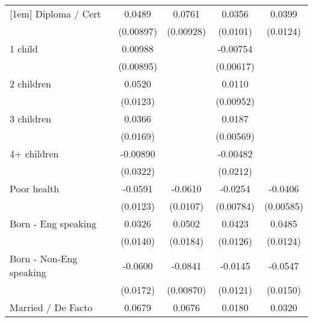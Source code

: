 {\begin{tabular}{l*{4}{c}}
[1em]
Diploma / Cert      &      0.0489\sym{***}&      0.0761\sym{***}&      0.0356\sym{***}&      0.0399\sym{**} \\
                    &   (0.00897)         &   (0.00928)         &    (0.0101)         &    (0.0124)         \\
[1em]
1 child             &     0.00988         &                     &    -0.00754         &                     \\
                    &   (0.00895)         &                     &   (0.00617)         &                     \\
[1em]
2 children          &      0.0520\sym{***}&                     &      0.0110         &                     \\
                    &    (0.0123)         &                     &   (0.00952)         &                     \\
[1em]
3 children          &      0.0366\sym{*}  &                     &      0.0187\sym{***}&                     \\
                    &    (0.0169)         &                     &   (0.00569)         &                     \\
[1em]
4+ children         &    -0.00890         &                     &    -0.00482         &                     \\
                    &    (0.0322)         &                     &    (0.0212)         &                     \\
[1em]
Poor health         &     -0.0591\sym{***}&     -0.0610\sym{***}&     -0.0254\sym{**} &     -0.0406\sym{***}\\
                    &    (0.0123)         &    (0.0107)         &   (0.00784)         &   (0.00585)         \\
[1em]
Born - Eng speaking &      0.0326\sym{*}  &      0.0502\sym{**} &      0.0423\sym{***}&      0.0485\sym{***}\\
                    &    (0.0140)         &    (0.0184)         &    (0.0126)         &    (0.0124)         \\
[1em]
Born - Non-Eng speaking&     -0.0600\sym{***}&     -0.0841\sym{***}&     -0.0145         &     -0.0547\sym{***}\\
                    &    (0.0172)         &   (0.00870)         &    (0.0121)         &    (0.0150)         \\
[1em]
Married / De Facto  &      0.0679\sym{***}&      0.0676\sym{***}&      0.0180         &      0.0320\sym{***}\\

\end{tabular}}
